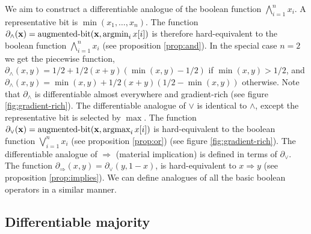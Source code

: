 \documentclass{article}
\theoremstyle{plain}
\theoremstyle{definition}
\theoremstyle{remark}
\begin{document}
We aim to construct a differentiable analogue of the boolean function $\bigwedge_{i=1}^{n} x_i$. A representative bit is $\operatorname{min}(x_{1},\dots,x_{n})$. The function
$\partial_{\wedge}({\bf x}) = \operatorname{augmented-bit}({\bf x}, \operatorname{argmin}\limits_{i} x[i])$
is therefore hard-equivalent to the boolean function $\bigwedge_{i=1}^{n} x_i$ (see proposition \ref{prop:and}). In the special case $n=2$ we get the piecewise function,
$\partial_{\wedge}\!(x, y) = 1/2 + 1/2(x + y)(\operatorname{min}(x,y) - 1/2)$ if $\operatorname{min}(x,y) > 1/2$, and $\partial_{\wedge}\!(x, y) = \operatorname{min}(x,y) + 1/2(x + y)(1/2 - \operatorname{min}(x,y))$
otherwise. Note that $\partial_{\wedge}$ is differentiable almost everywhere and gradient-rich (see figure \ref{fig:gradient-rich}).
The differentiable analogue of $\vee$ is identical to $\wedge$, except the representative bit is selected by $\operatorname{max}$. The function
$\partial_{\vee}({\bf x}) = \operatorname{augmented-bit}({\bf x}, \operatorname{argmax}\limits_{i} x[i])$ is hard-equivalent to the boolean function $\bigvee_{i=1}^{n} x_i$ (see proposition \ref{prop:or}) (see figure \ref{fig:gradient-rich}).
The differentiable analogue of $\Rightarrow$ (material implication) is defined in terms of $\partial_{\vee}$. The function
$\partial_{\Rightarrow}(x, y) = \partial_{\vee}\!(y, 1-x)$,
is hard-equivalent to $x \Rightarrow y$ (see proposition \ref{prop:implies}). We can define  analogues of all the basic boolean operators in a similar manner.

\subsection{Differentiable majority}
\end{document}
